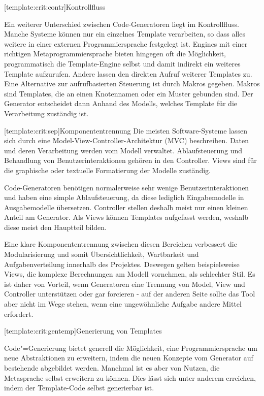 \documentclass[11pt, a4paper, bibgerm]{scrbook}
\newcommand\lsubsection{}
\newcommand{\cgen}{Code"=Generierung}
\begin{document}
\lsubsection[template:crit:contr]{Kontrollfluss}

Ein weiterer Unterschied zwischen Code-Generatoren liegt im
Kontrollfluss. Manche Systeme können nur ein einzelnes Template
verarbeiten, so dass alles weitere in einer externen Programmiersprache
festgelegt ist. Engines mit einer richtigen Metaprogrammiersprache
bieten hingegen oft die Möglichkeit, programmatisch die Template-Engine
selbst und damit indirekt ein weiteres Template aufzurufen. Andere
lassen den direkten Aufruf weiterer Templates zu. Eine Alternative zur
aufrufbasierten Steuerung ist durch Makros gegeben. Makros sind
Templates, die an einen Knotennamen oder ein Muster gebunden sind. Der
Generator entscheidet dann Anhand des Modells, welches Template für die
Verarbeitung zuständig ist.

\lsubsection[template:crit:sep]{Komponententrennung}
Die meisten Software-Systeme lassen sich durch eine
Model-View-Controller-Architektur (MVC)\cite[S.5ff]{DesignPatterns} beschreiben. Daten und deren
Verarbeitung werden vom Modell verwaltet. Ablaufsteuerung und Behandlung
von Benutzerinteraktionen gehören in den Controller. Views sind für die
graphische oder textuelle Formatierung der Modelle zuständig.

Code-Generatoren benötigen normalerweise sehr wenige
Benutzerinteraktionen und haben eine simple Ablaufsteuerung, da diese
lediglich Eingabemodelle in Ausgabemodelle übersetzen. Controller
stellen deshalb meist nur einen kleinen Anteil am Generator. Als Views
können Templates aufgefasst werden, weshalb diese meist den Hauptteil
bilden.

Eine klare Komponententrennung zwischen diesen Bereichen verbessert die
Modularisierung und somit Übersichtlichkeit, Wartbarkeit und
Aufgabenverteilung innerhalb des Projektes. Deswegen gelten
beispielsweise Views, die komplexe Berechnungen am Modell vornehmen, als
schlechter Stil. Es ist daher von Vorteil, wenn Generatoren eine
Trennung von Model, View und Controller unterstützen oder gar forcieren
- auf der anderen Seite sollte das Tool aber nicht im Wege stehen, wenn
eine ungewöhnliche Aufgabe andere Mittel erfordert.

\lsubsection[template:crit:gentemp]{Generierung von Templates}

\cgen{} bietet generell die Möglichkeit, eine Programmiersprache um neue
Abstraktionen zu erweitern, indem die neuen Konzepte vom Generator auf
bestehende abgebildet werden. Manchmal ist es aber von Nutzen, die
Metasprache selbst erweitern zu können. Dies lässt sich unter anderem
erreichen, indem der Template-Code selbst generierbar ist.
\end{document}
